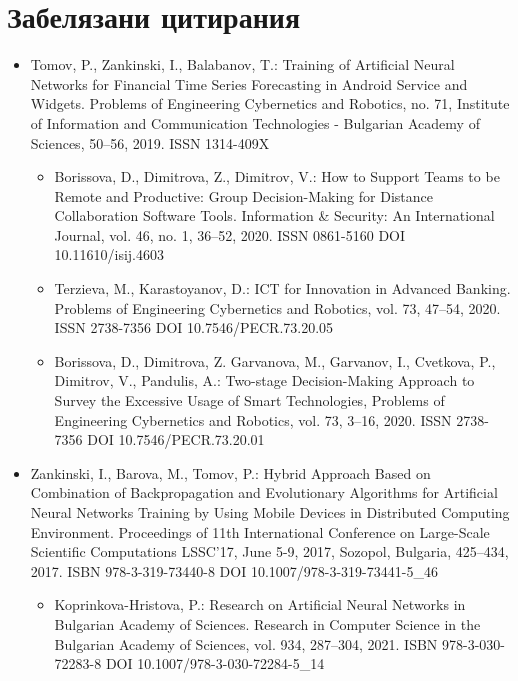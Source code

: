 \newpage
\section*{Забелязани цитирания}

\begin{itemize}
\item Tomov, P., Zankinski, I., Balabanov, T.: Training of Artificial Neural Networks for Financial Time Series Forecasting in Android Service and Widgets. Problems of Engineering Cybernetics and Robotics, no. 71, Institute of Information and Communication Technologies - Bulgarian Academy of Sciences, 50--56, 2019. ISSN 1314-409X
	\begin{itemize}
	\item Borissova, D., Dimitrova, Z., Dimitrov, V.: How to Support Teams to be Remote and Productive: Group Decision-Making for Distance Collaboration Software Tools. Information \& Security: An International Journal, vol. 46, no. 1, 36--52, 2020. ISSN 0861-5160 DOI 10.11610/isij.4603

	\item Terzieva, M., Karastoyanov, D.: ICT for Innovation in Advanced Banking. Problems of Engineering Cybernetics and Robotics, vol. 73, 47--54, 2020. ISSN 2738-7356 DOI 10.7546/PECR.73.20.05

	\item Borissova, D., Dimitrova, Z. Garvanova, M., Garvanov, I., Cvetkova, P., Dimitrov, V., Pandulis, A.: Two-stage Decision-Making Approach to Survey the Excessive Usage of Smart Technologies, Problems of Engineering Cybernetics and Robotics, vol. 73, 3--16, 2020. ISSN 2738-7356 DOI 10.7546/PECR.73.20.01
	\end{itemize}

\item Zankinski, I., Barova, M., Tomov, P.: Hybrid Approach Based on Combination of Backpropagation and Evolutionary Algorithms for Artificial Neural Networks Training by Using Mobile Devices in Distributed Computing Environment. Proceedings of 11th International Conference on Large-Scale Scientific Computations LSSC'17, June 5-9, 2017, Sozopol, Bulgaria, 425--434, 2017. ISBN 978-3-319-73440-8 DOI 10.1007/978-3-319-73441-5\_46
	\begin{itemize}
	\item Koprinkova-Hristova, P.: Research on Artificial Neural Networks in Bulgarian Academy of Sciences. Research in Computer Science in the Bulgarian Academy of Sciences, vol. 934, 287--304, 2021. ISBN 978-3-030-72283-8 DOI 10.1007/978-3-030-72284-5\_14
	\end{itemize}


\end{itemize}
